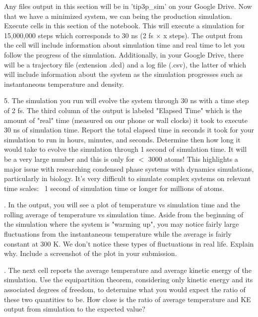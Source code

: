 \documentclass{article}
\begin{document}
Any files output in this section will be in 'tip3p\_sim' on your Google Drive. Now that we have a minimized system, we can being the production simulation. Execute cells in this section of the notebook. This will execute a simulation for 15,000,000 steps which corresponds to 30 ns (2 fs $\times$ x steps). The output from the cell will include information about simulation time and real time to let you follow the progress of the simulation. Additionally, in your Google Drive, there will be a trajectory file (extension .dcd) and a log file (.csv), the latter of which will include information about the system as the simulation progresses such as instantaneous temperature and density.

\vspace*{1cm} 5. The simulation you run will evolve the system through 30 ns with a time step of 2 fs. The third column of the output is labeled "Elapsed Time" which is the amount of "real" time (measured on our phone or wall  clocks) it took to execute 30 ns of simulation time. Report the total elapsed time in seconds it took for your simulation to run in hours, minutes, and seconds. Determine then how long it would take to evolve the simulation through 1 second of simulation time. It will be a very large number and this is only for $<$ 3000 atoms! This highlights a major issue with researching condensed phase systems with dynamics simulations, particularly in biology. It's very difficult to simulate complex systems on relevant time scales: ~1 second of simulation time or longer for millions of atoms.

\vspace*{1cm}
. In the output, you will see a plot of temperature vs simulation time and the rolling average of temperature vs simulation time. Aside from the beginning of the simulation where the system is "warming up", you may notice fairly large fluctuations from the instantaneous temperature while the average is fairly constant at 300 K. We don't notice these types of fluctuations in real life. Explain why. Include a screenshot of the plot in your submission.

\vspace*{1cm}
. The next cell reports the average temperature and average kinetic energy of the simulation. Use the equipartition theorem, considering only kinetic energy and its associated degrees of freedom, to determine what you would expect the ratio of these two quantities to be. How close is the ratio of average temperature and KE output from simulation to the expected value?
\end{document}
